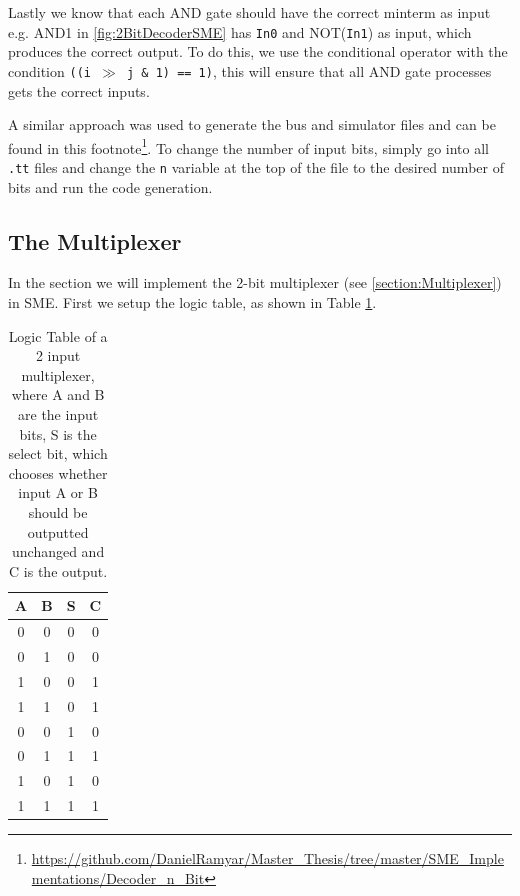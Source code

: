            Lastly we know that each AND gate should have the correct minterm as input e.g. AND1 in \ref{fig:2BitDecoderSME} has \texttt{In0} and NOT(\texttt{In1}) as input, which produces the correct output.
            To do this, we use the conditional operator with the condition \texttt{((i $\gg$ j \& 1) == 1)}, this will ensure that all AND gate processes gets the correct inputs.
            
            A similar approach was used to generate the bus and simulator files and can be found in this footnote\footnote{\url{https://github.com/DanielRamyar/Master_Thesis/tree/master/SME_Implementations/Decoder_n_Bit}}. To change the number of input bits, simply go into all \texttt{.tt} files and change the \texttt{n} variable at the top of the file to the desired number of bits and run the code generation.   
        
    
    \subsection{The Multiplexer}
        In the section we will implement the 2-bit multiplexer (see \ref{section:Multiplexer}) in SME. First we setup the logic table, as shown in Table \ref{LogicTable:2BitMultiplexer}. 
         \begin{table}[h!]
            \centering
            \begin{tabular}{|c|c|c||c|}
                \hline
                \textbf{A} & \textbf{B} & \textbf{S} & \textbf{C} \\ \hline
                0      &     0      &     0      &     0      \\ \hline
                0      &     1      &     0      &     0      \\ \hline
                1      &     0      &     0      &     1      \\ \hline
                1      &     1      &     0      &     1      \\ \hline
                0      &     0      &     1      &     0      \\ \hline
                0      &     1      &     1      &     1      \\ \hline
                1      &     0      &     1      &     0      \\ \hline
                1      &     1      &     1      &     1      \\ \hline
            \end{tabular}
            \caption{Logic Table of a 2 input multiplexer, where A and B are the input bits, S is the select bit, which chooses whether input A or B should be outputted unchanged and C is the output. }
            \label{LogicTable:2BitMultiplexer}
        \end{table}
        
